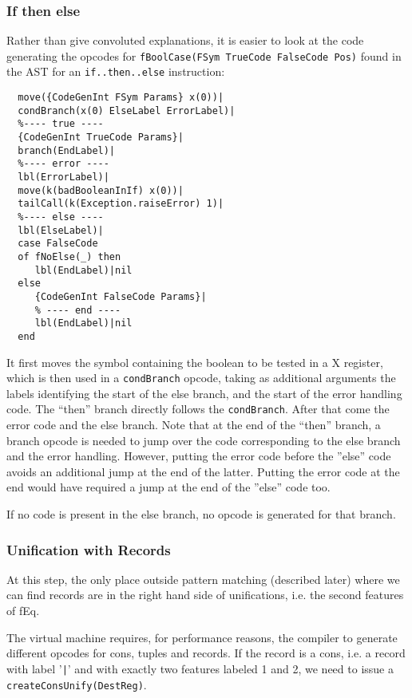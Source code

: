 \documentclass[a4paper]{memoir}
\begin{document}
\subsubsection{If then else}
Rather than give convoluted explanations, it is easier to look at the code generating the opcodes for \lstinline!fBoolCase(FSym TrueCode FalseCode Pos)! found in the AST for an \lstinline!if..then..else! instruction:
\begin{lstlisting}
  move({CodeGenInt FSym Params} x(0))|
  condBranch(x(0) ElseLabel ErrorLabel)|
  %---- true ----
  {CodeGenInt TrueCode Params}|
  branch(EndLabel)|
  %---- error ----
  lbl(ErrorLabel)|
  move(k(badBooleanInIf) x(0))|
  tailCall(k(Exception.raiseError) 1)|
  %---- else ----
  lbl(ElseLabel)|
  case FalseCode
  of fNoElse(_) then
     lbl(EndLabel)|nil
  else
     {CodeGenInt FalseCode Params}|
     % ---- end ----
     lbl(EndLabel)|nil
  end
\end{lstlisting}
It first moves the symbol containing the boolean to be tested in a X register,
which is then used in a \lstinline!condBranch! opcode, taking as additional
arguments the labels identifying the start of the else branch, and the start of
the error handling code. The ``then'' branch directly follows the
\lstinline!condBranch!. After that come the error code and the else branch. Note
that at the end of the ``then'' branch, a branch opcode is needed to jump over
the code corresponding to the else branch and the error handling. However,
putting the error code before the ''else'' code avoids an additional jump at the
end of the latter. Putting the error code at the end would have required a jump
at the end of the ''else'' code too.

If no code is present in the else branch, no opcode is generated for that branch.

\subsubsection{Unification with Records}
At this step, the only place outside pattern matching (described later) where we can find records are in the right hand side of unifications, i.e. the second features of fEq. 

The virtual machine requires, for performance reasons, the compiler to generate different opcodes for cons, tuples and records.
If the record is a cons, i.e. a record with label '\lstinline!|!' and with
exactly two features labeled 1 and 2, we need to issue a \lstinline!createConsUnify(DestReg)!. 
\end{document}
